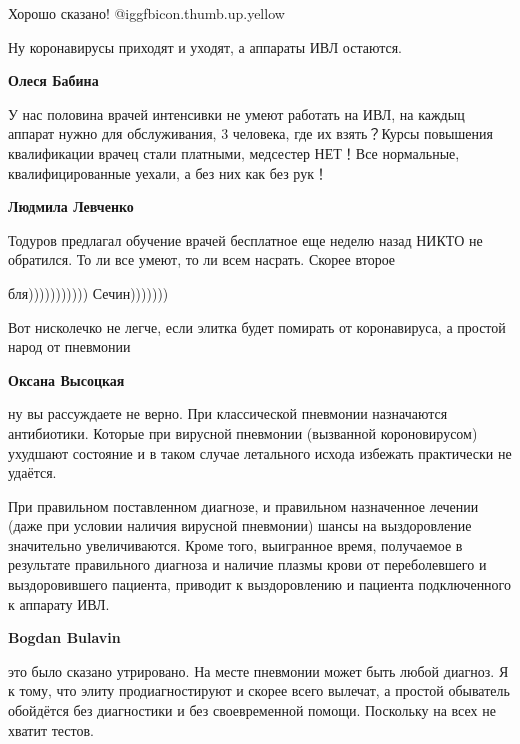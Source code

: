 \begin{itemize}
\begin{itemize} %
Хорошо сказано!  @igg{fbicon.thumb.up.yellow} 
\end{itemize} %

Ну коронавирусы приходят и уходят, а аппараты ИВЛ остаются.

\begin{itemize} %
\textbf{Олеся Бабина} 

У нас половина врачей интенсивки не умеют работать на ИВЛ, на каждыц аппарат
нужно для обслуживания, 3 человека, где их взять？Курсы повышения квалификации
врачец стали платными, медсестер НЕТ！Все нормальные, квалифицированные уехали,
а без них как без рук！


\textbf{Людмила Левченко} 

Тодуров предлагал обучение врачей бесплатное еще неделю назад НИКТО не
обратился. То ли все умеют, то ли всем насрать. Скорее второе

\end{itemize} %

бля))))))))))) Сечин)))))))

Вот нисколечко не легче, если элитка будет помирать от коронавируса, а простой народ от пневмонии

\begin{itemize} %
\textbf{Оксана Высоцкая} 

ну вы рассуждаете не верно. При классической пневмонии назначаются антибиотики.
Которые при вирусной пневмонии (вызванной короновирусом) ухудшают состояние и в
таком случае летального исхода избежать практически не удаётся.

При правильном поставленном диагнозе, и правильном назначенное лечении (даже
при условии наличия вирусной пневмонии) шансы на выздоровление значительно
увеличиваются. Кроме того, выигранное время, получаемое в результате
правильного диагноза и наличие плазмы крови от переболевшего и выздоровившего
пациента, приводит к выздоровлению и пациента подключенного к аппарату ИВЛ.


\textbf{Bogdan Bulavin} 

это было сказано утрировано. На месте пневмонии может быть любой диагноз. Я к
тому, что элиту продиагностируют и скорее всего вылечат, а простой обыватель
обойдётся без диагностики и без своевременной помощи. Поскольку на всех не
хватит тестов.


\end{itemize}
\end{itemize}
